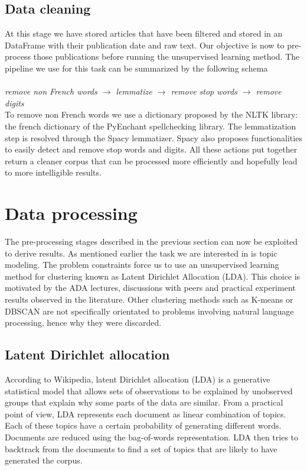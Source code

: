 \documentclass[11pt]{article}
\begin{document}
\subsection{Data cleaning}

At this stage we have stored articles that have been filtered and stored in an DataFrame with their publication date and raw text. Our objective is now to pre-process those publications before running the unsupervised learning method. The pipeline we use for this task can be summarized by the following schema
\\
\\
\textit{remove non French words $\rightarrow$ lemmatize $\rightarrow$ remove stop words $\rightarrow$ remove digits}
\\

To remove non French words we use a dictionary proposed by the NLTK library: the french dictionary of the PyEnchant spellchecking library. The lemmatization step is resolved through the Spacy lemmatizer. Spacy also proposes functionalities to easily detect and remove stop words and digits. All these actions put together return a cleaner corpus that can be processed more efficiently and hopefully lead to more intelligible results.

\section{Data processing}

The pre-processing stages described in the previous section can now be exploited to derive results. As mentioned earlier the task we are interested in is topic modeling. The problem constraints force us to use an unsupervised learning method for clustering known as Latent Dirichlet Allocation (LDA). This choice is motivated by the ADA lectures, discussions with peers and practical experiment results observed in the literature. %
Other clustering methods such as K-means or DBSCAN are not specifically orientated to problems involving natural language processing, hence why they were discarded.

\subsection{Latent Dirichlet allocation}
According to Wikipedia, latent Dirichlet allocation (LDA) is a generative statistical model that allows sets of observations to be explained by unobserved groups that explain why some parts of the data are similar.
From a practical point of view, LDA represents each document as linear combination of topics. Each of these topics have a certain probability of generating different words. Documents are reduced using the bag-of-words representation. LDA then tries to backtrack from the documents to find a set of topics that are likely to have generated the corpus.
\end{document}

